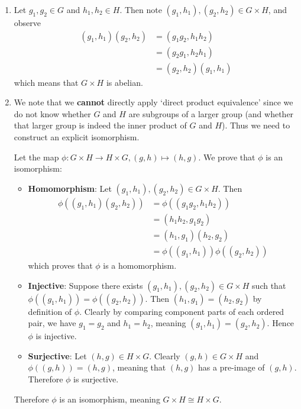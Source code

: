 \begin{enumerate}
    \item Let $g_1, g_2 \in G$ and $h_1, h_2 \in H$. Then note $(g_1, h_1), (g_2, h_2) \in G\times H$, and observe
    \begin{align*}
        (g_1, h_1)(g_2, h_2) &= (g_1g_2, h_1h_2)\\
        &= (g_2g_1, h_2h_1)\\
        &= (g_2,h_2)(g_1,h_1)
    \end{align*}
    which means that $G \times H$ is abelian.

    \item We note that we \textbf{cannot} directly apply `direct product equivalence' since we do not know whether $G$ and $H$ are subgroups of a larger group (and whether that larger group is indeed the inner product of $G$ and $H$). Thus we need to construct an explicit isomorphism.

    Let the map $\phi: G\times H \to H \times G, (g, h) \mapsto (h, g)$. We prove that $\phi$ is an isomorphism:
    \begin{itemize}
        \item \textbf{Homomorphism}: Let $(g_1, h_1), (g_2, h_2) \in G \times H$. Then
        \begin{align*}
            \phi((g_1, h_1)(g_2, h_2)) &= \phi((g_1g_2, h_1h_2))\\
            &= (h_1h_2, g_1g_2)\\
            &= (h_1, g_1)(h_2, g_2)\\
            &= \phi((g_1, h_1))\phi((g_2, h_2))
        \end{align*}
        which proves that $\phi$ is a homomorphism.
        \item \textbf{Injective}: Suppose there exists $(g_1, h_1), (g_2, h_2) \in G \times H$ such that $\phi((g_1, h_1)) = \phi((g_2, h_2))$. Then $(h_1, g_1) = (h_2, g_2)$ by definition of $\phi$. Clearly by comparing component parts of each ordered pair, we have $g_1 = g_2$ and $h_1 = h_2$, meaning $(g_1, h_1) = (g_2, h_2)$. Hence $\phi$ is injective.
        \item \textbf{Surjective}: Let $(h, g) \in H \times G$. Clearly $(g, h) \in G \times H$ and $\phi((g, h)) = (h, g)$, meaning that $(h, g)$ has a pre-image of $(g, h)$. Therefore $\phi$ is surjective.
    \end{itemize}
    Therefore $\phi$ is an isomorphism, meaning $G \times H \cong H \times G$.


\end{enumerate}
